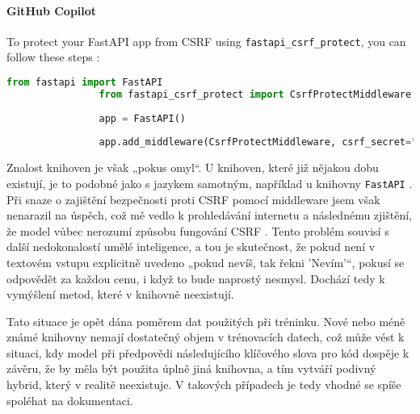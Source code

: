 \documentclass[FM,DP]{tulthesis}
\begin{document}
		\vspace{0.6em}
		\begin{tcolorbox}[colback=white,colframe=black,title=Implementace CSRF v Pythonu]
			\paragraph{GitHub Copilot}
			To protect your FastAPI app from CSRF using \verb|fastapi_csrf_protect|, you can follow these steps \cite{middleware}:
			
			\begin{lstlisting}[language=Python]
				from fastapi import FastAPI
				from fastapi_csrf_protect import CsrfProtectMiddleware
				
				app = FastAPI()
				
				app.add_middleware(CsrfProtectMiddleware, csrf_secret="your_secret_key")
			\end{lstlisting}
		\end{tcolorbox}
		
		Znalost knihoven je však „pokus omyl“. U knihoven, které již nějakou dobu existují, je to podobné jako s jazykem samotným, například u knihovny \verb|FastAPI| \cite{fastapi}. Při snaze o zajištění bezpečnosti proti CSRF pomocí middleware jsem však nenarazil na úspěch, což mě vedlo k prohledávání internetu a následnému zjištění, že model vůbec nerozumí způsobu fungování CSRF \cite{csrf} \cite{csrf_web}. Tento problém souvisí s další nedokonalostí umělé inteligence, a tou je skutečnost, že pokud není v textovém vstupu explicitně uvedeno „pokud nevíš, tak řekni 'Nevím'“, pokusí se odpovědět za každou cenu, i když to bude naprostý nesmysl. Dochází tedy k vymýšlení metod, které v knihovně neexistují.
		
		Tato situace je opět dána poměrem dat použitých při tréninku. Nové nebo méně známé knihovny nemají dostatečný objem v trénovacích datech, což může vést k situaci, kdy model při předpovědi následujícího klíčového slova pro kód dospěje k závěru, že by měla být použita úplně jiná knihovna, a tím vytváří podivný hybrid, který v realitě neexistuje. V takových případech je tedy vhodné se spíše spoléhat na dokumentaci.
		
\end{document}
